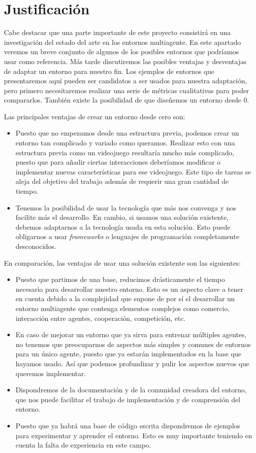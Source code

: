 \chapter{Justificación}
Cabe destacar que una parte importante de este proyecto consistirá en una investigación del estado del arte en los entornos multiagente. En este apartado veremos un breve conjunto de algunos de los posibles entornos que podríamos usar como referencia. Más tarde discutiremos las posibles ventajas y desventajas de adaptar un entorno para nuestro fin. Los ejemplos de entornos que presentaremos aquí pueden ser candidatos a ser usados para nuestra adaptación, pero primero necesitaremos realizar una serie de métricas cualitativas para poder compararlos. También existe la posibilidad de que diseñemos un entorno desde 0.  

Las principales ventajas de crear un entorno desde cero son:
\begin{itemize}
    \item Puesto que no empezamos desde una estructura previa, podemos crear un entorno tan complicado y variado como queramos. Realizar esto con una estructura previa como un videojuego resultaría mucho más complicado, puesto que para añadir ciertas interacciones deberíamos modificar o implementar nuevas características para ese videojuego. Este tipo de tareas se aleja del objetivo del trabajo además de requerir una gran cantidad de tiempo.
    \item Tenemos la posibilidad de usar la tecnología que más nos convenga y nos facilite más el desarrollo. En cambio, si usamos una solución existente, debemos adaptarnos a la tecnología usada en esta solución. Esto puede obligarnos a usar \emph{frameworks} o lenguajes de programación completamente desconocidos.  
\end{itemize}

En comparación, las ventajas de usar una solución existente son las siguientes:

\begin{itemize}
    \item Puesto que partimos de una base, reducimos drásticamente el tiempo necesario para desarrollar nuestro entorno. Esto es un aspecto clave a tener en cuenta debido a la complejidad que supone de por sí el desarrollar un entorno multiagente que contenga elementos complejos como comercio, interacción entre agentes, cooperación, competición, etc.
    \item En caso de mejorar un entorno que ya sirva para entrenar múltiples agentes, no tenemos que preocuparnos de aspectos más simples y comunes de entornos para un único agente, puesto que ya estarán implementados en la base que hayamos usado. Así que podemos profundizar y pulir los aspectos nuevos que queremos implementar.
    \item Dispondremos de la documentación y de la comunidad creadora del entorno, que nos puede facilitar el trabajo de implementación y de comprensión del entorno.
    \item Puesto que ya habrá una base de código escrita dispondremos de ejemplos para experimentar y aprender el entorno. Esto es muy importante teniendo en cuenta la falta de experiencia en este campo.
\end{itemize}

